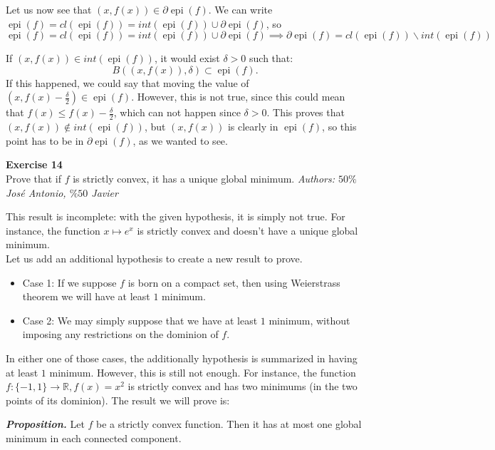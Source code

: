 \documentclass[11pt,table]{article}
\newenvironment{problem}[2][Exercise]
{ \begin{mdframed}[backgroundcolor=gray!20] \textbf{#1 #2} \\}
	{\hspace{0.0cm}\newline\newline \emph{Authors: \(50\%\) José Antonio, \(\%50\) Javier}  \end{mdframed}}
\newcommand\R{\mathbb R}
\begin{document}
Let us now see that \((x,f(x)) \in \partial \operatorname{epi}(f)\). We can write \(\operatorname{epi}(f) = cl(\operatorname{epi}(f)) = int(\operatorname{epi}(f)) \cup \partial \operatorname{epi}(f)\), so
\[
	\operatorname{epi}(f) = cl(\operatorname{epi}(f)) = int(\operatorname{epi}(f)) \cup \partial \operatorname{epi}(f)	\implies \partial \operatorname{epi}(f) = cl(\operatorname{epi}(f)) \backslash int(\operatorname{epi}(f))
\]

If \((x,f(x)) \in int(\operatorname{epi}(f))\), it would exist \(\delta > 0\) such that:
\[
	B((x,f(x)),\delta) \subset \operatorname{epi}(f).
\]
If this happened, we could say that moving the value of  \((x,f(x)- \frac{\delta}{2}) \in \operatorname{epi}(f) \). However, this is not true, since this could mean that \(f(x) \leq f(x) - \frac{\delta}{2}\), which can not happen since \(\delta > 0\). This proves that \((x,f(x))\notin int(\operatorname{epi}(f))\), but \((x,f(x))\) is clearly in \(\operatorname{epi}(f)\), so this point has to be in \(\partial \operatorname{epi}(f)\), as we wanted to see.

\begin{problem}{14}
Prove that if \( f \)  is strictly convex, it has a unique global minimum.
\end{problem}

This result is incomplete: with the given hypothesis, it is simply not true. For instance, the function $x \mapsto e^x$ is strictly convex and doesn't have a unique global minimum. \\

Let us add an additional hypothesis to create a new result to prove.

\begin{itemize}
	\item Case 1: If we suppose $f$ is born on a compact set, then using Weierstrass theorem we will have at least $1$ minimum.
	\item Case 2: We may simply suppose that we have at least $1$ minimum, without imposing any restrictions on the dominion of $f$.
\end{itemize}

In either one of those cases, the additionally hypothesis is summarized in having at least $1$ minimum. However, this is still not enough. For instance, the function $f:\{-1,1\} \rightarrow \R, f(x) = x^2$ is strictly convex and has two minimums (in the two points of its dominion). The result we will prove is:

\emph{\textbf{Proposition.}} Let \( f \) be a strictly convex function. Then  it has at most one global minimum in each connected component.
\end{document}
